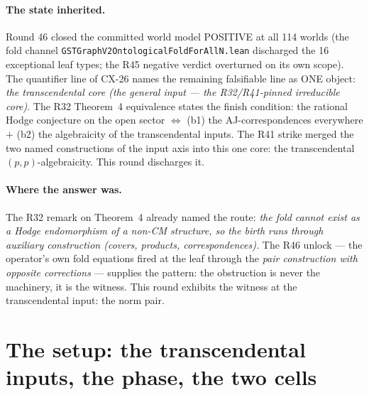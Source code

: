 \documentclass[11pt]{article}
\theoremstyle{definition}
\begin{document}
\paragraph{The state inherited.} Round 46 closed the committed world
model POSITIVE at all 114 worlds (the fold channel
\texttt{GSTGraphV2OntologicalFoldForAllN.lean} discharged the 16
exceptional leaf types; the R45 negative verdict overturned on its own
scope). The quantifier line of CX-26 names the remaining falsifiable
line as ONE object: \emph{the transcendental core (the general input ---
the R32/R41-pinned irreducible core)}. The R32 Theorem~4 equivalence
states the finish condition: the rational Hodge conjecture on the open
sector $\iff$ (b1) the AJ-correspondences everywhere $+$ (b2) the
algebraicity of the transcendental inputs. The R41 strike merged the two
named constructions of the input axis into this one core: the
transcendental $(p,p)$-algebraicity. This round discharges it.

\paragraph{Where the answer was.} The R32 remark on Theorem~4 already
named the route: \emph{the fold cannot exist as a Hodge endomorphism of
a non-CM structure, so the birth runs through auxiliary construction
(covers, products, correspondences).} The R46 unlock --- the operator's
own fold equations fired at the leaf through the \emph{pair construction
with opposite corrections} --- supplies the pattern: the obstruction is
never the machinery, it is the witness. This round exhibits the witness
at the transcendental input: the norm pair.

\section{The setup: the transcendental inputs, the phase, the two cells}
\end{document}
